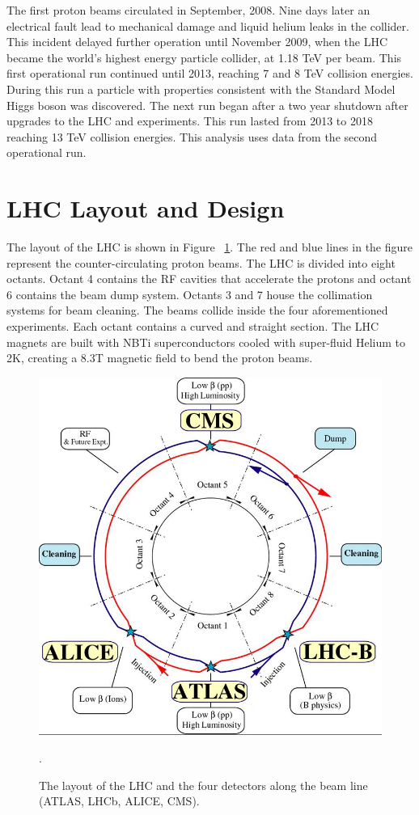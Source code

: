 The first proton beams circulated in September, 2008. Nine days later an electrical fault lead to mechanical damage and liquid helium leaks in the collider. This incident delayed further operation until November 2009, when the LHC became the world's highest energy particle collider, at 1.18 TeV per beam. This first operational run continued until 2013, reaching 7 and 8 TeV collision energies. During this run a particle with properties consistent with the Standard Model Higgs boson was discovered. The next run began after a two year shutdown after upgrades to the LHC and experiments. This run lasted from 2013 to 2018 reaching 13 TeV collision energies. This analysis uses data from the second operational run. 
\section{LHC Layout and Design}
The layout of the LHC is shown in Figure ~\ref{fig:lhc_layout}. The red and blue lines in the figure represent the counter-circulating proton beams. The LHC is divided into eight octants.  Octant 4 contains the RF cavities that accelerate the protons and octant 6 contains the beam dump system. Octants 3 and 7 house the collimation systems for beam cleaning. The beams collide inside the four aforementioned experiments. Each octant contains a curved and straight section. The LHC magnets are built with NBTi superconductors cooled with super-fluid Helium to 2K, creating a 8.3T magnetic field to bend the proton beams.


\begin{figure}[h!]
  \centering
  \includegraphics[width=\hsize]{figures/Detector/lhc.jpg}
  \caption{The layout of the LHC and the four detectors along the beam line (ATLAS, LHCb, ALICE, CMS).}. 
  \label{fig:lhc_layout}
\end{figure}
\FloatBarrier


